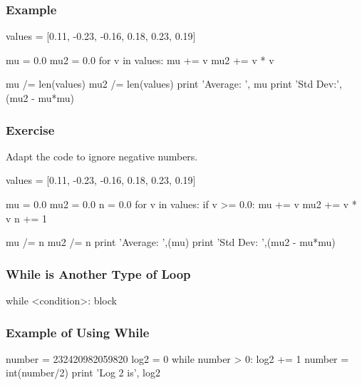 \begin{frame}[fragile]
\frametitle{Example}

\begin{python}
values = [0.11, -0.23, -0.16, 0.18, 0.23, 0.19]

mu = 0.0
mu2 = 0.0
for v in values:
    mu += v
    mu2 += v * v

mu /= len(values)
mu2 /= len(values)
print 'Average: ', mu
print 'Std Dev:', (mu2 - mu*mu)
\end{python}
\end{frame}

\begin{frame}[fragile]
\frametitle{Exercise}

Adapt the code to ignore negative numbers.

\pause

\begin{python}
values = [0.11, -0.23, -0.16, 0.18, 0.23, 0.19]

mu = 0.0
mu2 = 0.0
n = 0.0
for v in values:
    if v >= 0.0:
        mu += v
        mu2 += v * v
        n += 1

mu /= n
mu2 /= n
print 'Average: ',(mu)
print 'Std Dev: ',(mu2 - mu*mu)
\end{python}

\end{frame}

\begin{frame}[fragile]
\frametitle{While is Another Type of Loop}
\begin{python}
while <condition>:
    block
\end{python}

\end{frame}

\begin{frame}[fragile]
\frametitle{Example of Using While}

\begin{python}
number = 232420982059820
log2 = 0
while number > 0:
    log2 += 1
    number = int(number/2)
print 'Log 2 is', log2
\end{python}

\end{frame}

